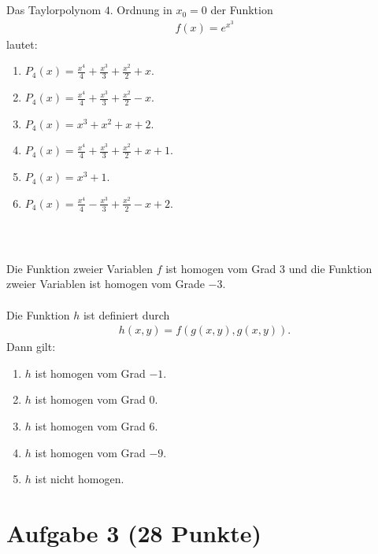 \subsection*{}
Das Taylorpolynom $ 4 $. Ordnung in $ x_0 = 0 $ der Funktion
\begin{align*}
	f(x) = e^{x^3}
\end{align*}
lautet:
\renewcommand{\labelenumi}{(\alph{enumi})}
\begin{enumerate}
	\item 
	$ P_4(x) = \frac{x^4}{4} + \frac{x^3}{3} + \frac{x^2}{2} + x $. 
	\item
	$ P_4(x) = \frac{x^4}{4} + \frac{x^3}{3} + \frac{x^2}{2} - x $. 
	\item
	$ P_4(x) = x^3 + x^2 + x + 2$. 
	\item
	$ P_4(x) = \frac{x^4}{4} + \frac{x^3}{3} + \frac{x^2}{2} + x +1 $. 
	\item
	$ P_4(x) = x^3 + 1$. 
	\item
	$ P_4(x) = \frac{x^4}{4} - \frac{x^3}{3} + \frac{x^2}{2} - x + 2 $. 
\end{enumerate}
\ \\
\subsection*{}
Die Funktion zweier Variablen $ f $ ist homogen vom Grad $ 3 $ und die Funktion zweier Variablen ist homogen vom Grade $ -3 $.\\
\\
Die Funktion $ h $ ist definiert durch
\begin{align*}
	h(x,y) = f(g(x,y),g(x,y)).
\end{align*}
Dann gilt:
\renewcommand{\labelenumi}{(\alph{enumi})}
\begin{enumerate}
	\item 
	$ h $ ist homogen vom Grad $ -1 $. 
	\item
	$ h $ ist homogen vom Grad $ 0 $. 
	\item
	$ h $ ist homogen vom Grad $ 6 $. 
	\item
	$ h $ ist homogen vom Grad $ -9 $.  
	\item
	$ h $ ist nicht homogen.
\end{enumerate}

\newpage
\section*{Aufgabe 3 (28 Punkte)}
\vspace{0.4cm}

